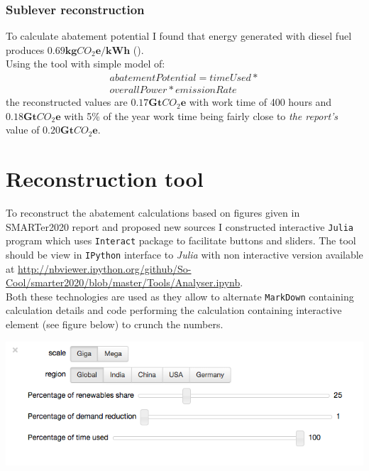 \documentclass[11pt, twocolumn]{article}
\begin{document}
\subsubsection{Sublever reconstruction\label{sec:off-grid:reconstruction}}
To calculate abatement potential I found that energy generated with diesel fuel produces $\mathbf{0.69kg}CO_2\mathbf{e}/\mathbf{kWh}$ (\citep{iea2012co2}).\\
Using the tool with simple model of:\\
\begin{gather*}
  abatementPotential = timeUsed *\\
  overallPower * emissionRate
\end{gather*}
the reconstructed values are $\mathbf{0.17} \mathbf{Gt}CO_2\mathbf{e}$ with work time of 400 hours and $\mathbf{0.18} \mathbf{Gt}CO_2\mathbf{e}$ with 5\% of the year work time being fairly close to \emph{the report's} value of $\mathbf{0.20} \mathbf{Gt}CO_2\mathbf{e}$.




\section{Reconstruction tool}
To reconstruct the abatement calculations based on figures given in SMARTer2020 report and proposed new sources I constructed interactive \texttt{Julia} program which uses \texttt{Interact} package to facilitate buttons and sliders. The tool should be view in \texttt{IPython} interface to \emph{Julia} with non interactive version available at \url{http://nbviewer.ipython.org/github/So-Cool/smarter2020/blob/master/Tools/Analyser.ipynb}.\\
Both these technologies are used as they allow to alternate \texttt{MarkDown} containing calculation details and code performing the calculation containing interactive element (see figure below) to crunch the numbers.

\begin{center}
\noindent\includegraphics[scale=0.4]{interface.png}
\end{center}
\end{document}

